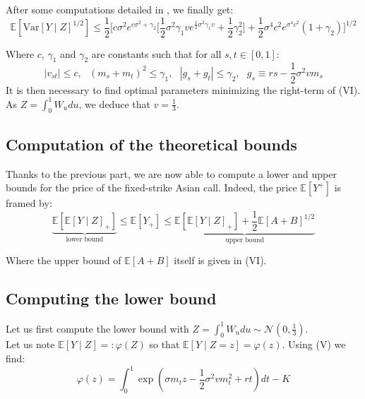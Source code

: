 \documentclass{article}
\begin{document}
After some computations detailed in \cite{Rogers}, we finally get:
\begin{equation}
    \mathbb{E}[\mathrm{Var}[Y\mid Z]^{1/2}]
    \leq \frac{1}{2}\Biggl[
    	c\sigma^{2}e^{c\sigma^{2}+\gamma_{2}}\biggl[
		\frac{1}{2}\sigma^{2}\gamma_{1}v e^{{\frac{1}{2}}\sigma^{2}\gamma_{1}v}
			+{\textstyle{\frac{1}{2}}}\gamma_{2}^{2}
		\biggr]+{\textstyle{\frac{1}{2}}}\sigma^{4}c^{2}e^{\sigma^{4}c^{2}}(1+\gamma_{2})
	\Biggr]^{1/2} \tag{VI}
\end{equation}

Where $c$, $\gamma_1$ and $\gamma_2$ are constants such that for all $s, t \in [0, 1]$:
\begin{equation}
    |v_{s t}|\leq c,\ \ \ (m_{s}+m_{t})^{2}\leq\gamma_{1},\ \ \ |g_{s}+g_{t}|\leq\gamma_{2} ,\ \ \ 
    g_s\equiv r s-\textstyle{\frac{1}{2}}\sigma^{2}v m_{s}
    \tag{VII}
\end{equation}
It is then necessary to find optimal parameters minimizing the right-term of (VI).
As $Z=\int_{0}^{1}W_u du$, we deduce that $v=\frac{1}{3}$.

\subsection{Computation of the theoretical bounds}

Thanks to the previous part, we are now able to compute a lower and upper bounds for the price of the
fixed-strike Asian call. Indeed, the price $\mathbb{E}[Y^{+}]$ is framed by:
\begin{equation}
    \underbrace{\mathbb{E}[\mathbb{E}[Y\mid Z]_{+}]}_{\text{lower bound}}
    \leqslant \mathbb{E}[Y_{+}]
    \leqslant \underbrace{\mathbb{E}[\mathbb{E}[Y\mid Z]_{+}] +
    	\frac{1}{2} \mathbb{E}[A+B]^{1/2}}_{\text{upper bound}}
    \tag{VIII}
\end{equation}

Where the upper bound of $\mathbb E[A+B]$ itself is given in (VI).

\subsection{Computing the lower bound}

Let us first compute the lower bound with
$Z=\int_{0}^{1}W_u du \sim \mathcal{N}(0,\frac{1}{3})$.
\\

Let us note $\mathbb{E}[Y\mid Z] =: \varphi(Z)$ so that $\mathbb{E}[Y\mid Z=z]=\varphi(z)$.
Using (V) we find:
\[
	\varphi(z)=\int_{0}^{1}\exp(\sigma m_t z-{\textstyle\frac{1}{2}}\sigma^{2}v m_{t}^{2}+r t)dt - K
\]
\end{document}

